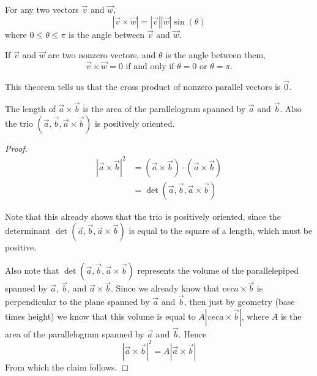\documentclass{ximera}
\begin{document}
\begin{theorem}
  For any two vectors $\vec{v}$ and $\vec{w}$,
  \[
  |\vec{v} \times \vec{w}| = |\vec{v}||\vec{w}|\sin(\theta)
  \]
  where $0\le \theta\le\pi$ is the angle between $\vec{v}$ and
  $\vec{w}$.
\end{theorem}

\begin{theorem}
  If $\vec{v}$ and $\vec{w}$ are two nonzero vectors, and $\theta$ is
  the angle between them,
  \[
  \vec{v}\times \vec{w} = 0 \text{ if and only if $\theta=
  0$ or $\theta=\pi$}.
  \]
\end{theorem}

This theorem tells us that the cross product of nonzero parallel
vectors is $\vec{0}$.



\begin{theorem}
  The length of $\vec{a} \times \vec{b}$ is the area of the
  parallelogram spanned by $\vec{a}$ and $\vec{b}$.  Also the trio
  $(\vec{a},\vec{b},\vec{a} \times \vec{b})$ is positively oriented.
\end{theorem}

\begin{proof}
  \begin{align*}
    |\vec{a} \times \vec{b}|^2  &=(\vec{a} \times \vec{b}) \cdot (\vec{a} \times \vec{b})\\
    &=\det(\vec{a},\vec{b},\vec{a} \times \vec{b})
  \end{align*}
  
  Note that this already shows that the trio is positively oriented,
  since the determinant $\det(\vec{a},\vec{b},\vec{a} \times \vec{b})$
  is equal to the square of a length, which must be positive.
  
  Also note that $\det(\vec{a},\vec{b},\vec{a} \times \vec{b})$
  represents the volume of the parallelepiped spanned by $\vec{a}$,
  $\vec{b}$, and $\vec{a} \times \vec{b}$.  Since we already know that
  $vec{a} \times \vec{b}$ is perpendicular to the plane spanned by
  $\vec{a}$ and $\vec{b}$, then just by geometry (base times height)
  we know that this volume is equal to $A |vec{a} \times \vec{b}|$,
  where $A$ is the area of the parallelogram spanned by $\vec{a}$ and
  $\vec{b}$.  Hence
  \[
  |\vec{a} \times \vec{b}|^2 = A |\vec{a} \times \vec{b}|
  \]
  From which the claim follows.
\end{proof}
\end{document}
